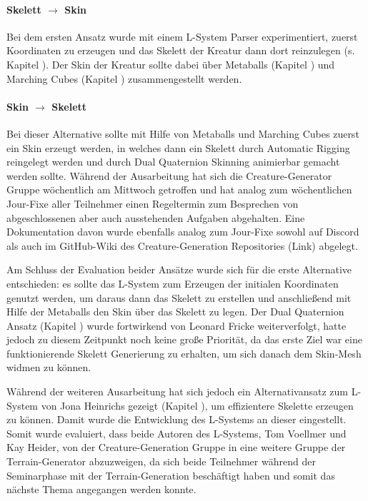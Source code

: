 \paragraph{Skelett $\rightarrow$ Skin} Bei dem ersten Ansatz wurde mit einem L-System Parser experimentiert, zuerst Koordinaten zu erzeugen und das Skelett der Kreatur dann dort reinzulegen (s. Kapitel ). Der Skin der Kreatur sollte dabei über Metaballs (Kapitel ) und Marching Cubes (Kapitel ) zusammengestellt werden.

\paragraph{Skin $\rightarrow$ Skelett} Bei dieser Alternative sollte mit Hilfe von Metaballs und Marching Cubes zuerst ein Skin erzeugt werden, in welches dann ein Skelett durch Automatic Rigging reingelegt werden und durch Dual Quaternion Skinning animierbar gemacht werden sollte.
\newline \newline
Während der Ausarbeitung hat sich die Creature-Generator Gruppe wöchentlich am Mittwoch getroffen und hat analog zum wöchentlichen Jour-Fixe aller Teilnehmer einen Regeltermin zum Besprechen von abgeschlossenen aber auch ausstehenden Aufgaben abgehalten. Eine Dokumentation davon wurde ebenfalls analog zum Jour-Fixe sowohl auf Discord als auch im GitHub-Wiki des Creature-Generation Repositories (Link) abgelegt.

Am Schluss der Evaluation beider Ansätze wurde sich für die erste Alternative entschieden: es sollte das L-System zum Erzeugen der initialen Koordinaten genutzt werden, um daraus dann das Skelett zu erstellen und anschließend mit Hilfe der Metaballs den Skin über das Skelett zu legen. Der Dual Quaternion Ansatz (Kapitel ) wurde fortwirkend von Leonard Fricke weiterverfolgt, hatte jedoch zu diesem Zeitpunkt noch keine große Priorität, da das erste Ziel war eine funktionierende Skelett Generierung zu erhalten, um sich danach dem Skin-Mesh widmen zu können.  

Während der weiteren Ausarbeitung hat sich jedoch ein Alternativansatz zum L-System von Jona Heinrichs gezeigt (Kapitel ), um effizientere Skelette erzeugen zu können. Damit wurde die Entwicklung des L-Systems an dieser eingestellt. Somit wurde evaluiert, dass beide Autoren des L-Systems, Tom Voellmer und Kay Heider, von der Creature-Generation Gruppe in eine weitere Gruppe der Terrain-Generator abzuzweigen, da sich beide Teilnehmer während der Seminarphase mit der Terrain-Generation beschäftigt haben und somit das nächste Thema angegangen werden konnte.

